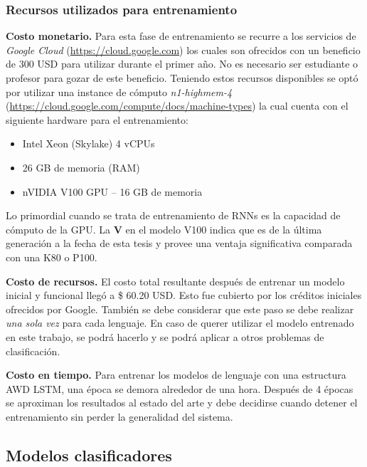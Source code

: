 \subsubsection{Recursos utilizados para entrenamiento}

\textbf{Costo monetario.} Para esta fase de entrenamiento se recurre a los servicios de \textit{Google Cloud} (\href{https://cloud.google.com/free}{https://cloud.google.com}) los cuales son ofrecidos con un beneficio de 300 USD para utilizar durante el primer año. No es necesario ser estudiante o profesor para gozar de este beneficio. Teniendo estos recursos disponibles se optó por utilizar una instance de cómputo \emph{n1-highmem-4} (\url{https://cloud.google.com/compute/docs/machine-types}) la cual cuenta con	el siguiente hardware para el entrenamiento:


\begin{itemize}
\item Intel Xeon (Skylake) 4 vCPUs
\item 26 GB de memoria (RAM)
\item nVIDIA V100 GPU -- 16 GB de memoria
\end{itemize}

Lo primordial cuando se trata de entrenamiento de RNNs es la capacidad de cómputo de la GPU. La \textbf{V} en el modelo V100 indica que es de la última generación a la fecha de esta tesis y provee una ventaja significativa comparada con una K80 o P100.

\textbf{Costo de recursos.} El costo total resultante después de entrenar un modelo inicial y funcional llegó a \$ 60.20 USD. Esto fue cubierto por los créditos iniciales ofrecidos por Google. También se debe considerar que este paso se debe realizar \emph{una sola vez} para cada lenguaje. En caso de querer utilizar el modelo entrenado en este trabajo, se podrá hacerlo y se podrá aplicar a otros problemas de clasificación.

\textbf{Costo en tiempo.} Para entrenar los modelos de lenguaje con una estructura AWD LSTM, una época se demora alrededor de una hora. Después de 4 épocas se aproximan los resultados al estado del arte y debe decidirse cuando detener el entrenamiento sin perder la generalidad del sistema.

\subsection{Modelos clasificadores}

